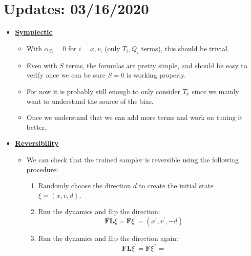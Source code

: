 \section{Updates: 03/16/2020}%
\label{sec:updates_2020_03_16}
\begin{itemize}
  \item \textbf{\uline{Symplectic}}
    \begin{itemize}
      \item With $\alpha_{S_{i}} = 0$ for \(i = x, v\), (only \(T_{i}, Q_{i}\)
        terms), this should be trivial.
      \item Even with \(S\) terms, the formulas are pretty simple, and should
        be easy to verify once we can be sure \(S = 0\) is working properly.
      \item For now it is probably still enough to only consider \(T_{x}\)
        since we mainly want to understand the source of the bias.
      \item Once we understand that we can add more terms and work on tuning it
        better.
    \end{itemize}
  \item \textbf{\uline{Reversibility}}
    \begin{itemize}
      \item We can check that the trained sampler is reversible using the
        following procedure:
        \begin{enumerate}
          \item Randomly choose the direction \(d\) to create the initial state
            \(\xi = (x, v, d)\).
          \item Run the dynamics and flip the direction:
            \begin{equation}
              \mathbf{FL} \xi = \mathbf{F}\xi^{\prime} = (x^{\prime}, v^{\prime}, - d)
            \end{equation}
          \item Run the dynamics and flip the direction again:
            \begin{equation}
              \mathbf{FL} \xi^{\prime} = \mathbf{F} \xi^{\prime\prime} =

\end{equation}
\end{enumerate}
\end{itemize}
\end{itemize}
